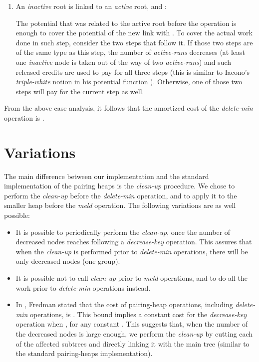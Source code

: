 \begin{enumerate}
\item An {\it inactive} root is linked to an {\it active} root, and : 

The potential that was related to the active root before the operation is enough to cover the potential of the new link with . 
To cover the actual work done in such step, consider the two steps that follow it. If those two steps are of the same type as this step, the number of {\it active-runs} decreases (at least one {\it inactive} node is taken out of the way of two {\it active-runs}) and such released credits are used to pay for all three steps (this is similar to Iacono's {\it triple-white} notion in his potential function \cite{ia}). Otherwise, one of those two steps will pay for the current step as well. 

\end{enumerate}

From the above case analysis, it follows that the amortized cost of the {\it delete-min} operation is .


\section{Variations}

The main difference between our implementation and the standard implementation of the pairing heaps is the {\it clean-up} procedure. We chose to perform the {\it clean-up} before the {\it delete-min} operation, and to apply it to the smaller heap before the {\it meld} operation. 
The following variations are as well possible:

\begin{itemize}

\item It is possible to periodically perform the {\it clean-up}, once the number of decreased nodes reaches  following a {\it decrease-key} operation. This assures that when the {\it clean-up} is performed prior to {\it delete-min} operations, there will be only  decreased nodes (one group). 

\item It is possible not to call {\it clean-up} prior to {\it meld} operations, and to do all the work prior to {\it delete-min} operations instead.

\item  In \cite{f}, Fredman stated that the cost of  pairing-heap operations, including  {\it delete-min} operations, is . This bound implies a constant cost for the {\it decrease-key} operation when , for any constant . This suggests that, when the number of the decreased nodes is large enough, we perform the {\it clean-up} by cutting each of the affected subtrees and directly linking it with the main tree (similar to the standard pairing-heaps implementation). 

\end{itemize}


